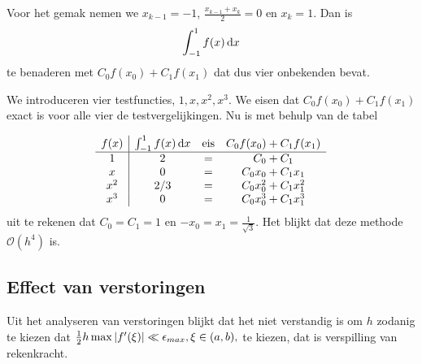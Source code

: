 \documentclass{2wn20summary}
\begin{document}
			Voor het gemak nemen we $x_{k-1}=-1$, $\frac{x_{k-1}+x_k}{2}=0$ en $x_k=1$.
			Dan is
			\[
				\int_{-1}^1 f(x) \mathop{}\!\mathrm{d} x
			 \]
			 te benaderen met
			 $
				 C_0 f(x_0) + C_1 f(x_1)
			  $
			  dat dus vier onbekenden bevat.

			  We introduceren vier testfuncties, $1,x,x^2,x^3$. We eisen dat $C_0 f(x_0) + C_1 f(x_1)$ exact is voor alle vier de testvergelijkingen. Nu is met behulp van de tabel

			  \[
				  \begin{array}{c|ccc}
				  f(x) & \int_{-1}^1 f(x)\mathop{}\!\mathrm{d} x & \text {eis} & C_0 f(x_0) + C_1 f(x_1) \\ \hline
				  1 & 2 & = & C_0 + C_1 \\
				  x & 0 & = & C_0 x_0 + C_1 x_1 \\
				  x^2 & 2/3 & = & C_0 x_0^2 + C_1 x_1^2 \\
				  x^3 & 0 & = & C_0 x_0^3 + C_1 x_1^3
				  \end{array}
			   \]
			   uit te rekenen dat $C_0=C_1=1$ en $-x_0 = x_1 = \frac{1}{\sqrt{3}}$. Het blijkt dat deze methode $\mathcal{O} (h^4)$ is.

			   \subsection{Effect van verstoringen}
			   Uit het analyseren van verstoringen blijkt dat het niet verstandig is om $h$ zodanig te kiezen dat $\frac{1}{2}h \max \abs{f'(\xi)} \ll \epsilon_{max}, \xi \in (a,b),$ te kiezen, dat is verspilling van rekenkracht.

	\newpage
	\printindex
	
	
\end{document}
